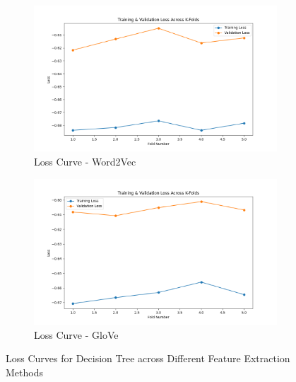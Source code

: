 \begin{figure}[H]
    \begin{subfigure}[b]{0.44\textwidth}
        \includegraphics[width=\textwidth]{img/report_info/img/1.2.DecisionTree/best_decision_tree_word2vec_loss.png}
        \caption{Loss Curve - Word2Vec}
        \label{fig:lr-word2vec-loss}
    \end{subfigure}
    \begin{subfigure}[b]{0.44\textwidth}
        \includegraphics[width=\textwidth]{img/report_info/img/1.2.DecisionTree/best_decision_tree_glove_loss.png}
        \caption{Loss Curve - GloVe}
        \label{fig:lr-glove-loss}
    \end{subfigure}
    
    \caption{Loss Curves for Decision Tree across Different Feature Extraction Methods}
    \label{fig:lr-loss-group}
\end{figure}

